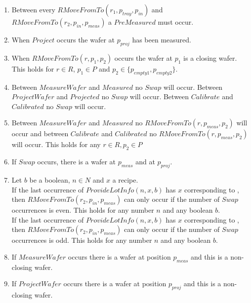 \begin{enumerate}
    \item Between every $\mathit{RMoveFromTo}(r_1, p_\mathit{tray},p_\mathit{in})$ and $\mathit{RMoveFromTo}(r_2, p_\mathit{in}, p_\mathit{meas})$ a $\mathit{PreMeasured}$ must occur.

    \item When $Project$ occurs the wafer at $p_\mathit{proj}$ has been measured.

    \item When $RMoveFromTo(r, p_1, p_2)$ occurs the wafer at $p_1$ is a closing wafer. This holds for $r \in R$, $p_1 \in P$ and $p_2 \in \{p_\textit{empty1}, p_\textit{empty2}\}$.
    
    \item Between $MeasureWafer$ and $Measured$ no $Swap$ will occur. Between $ProjectWafer$ and $Projected$ no $Swap$ will occur. Between $Calibrate$ and $Calibrated$ no $Swap$ will occur.

    \item Between $MeasureWafer$ and $Measured$ no $RMoveFromTo(r, p_\mathit{meas}, p_2)$ will occur and between $Calibrate$ and $Calibrated$ no $RMoveFromTo(r, p_\mathit{meas}, p_2)$ will occur. This holds for any $r \in R, p_2 \in P$
    
    \item If $Swap$ occurs, there is a wafer at $p_\mathit{meas}$ and at $p_\mathit{proj}$.

    \item Let $b$ be a boolean, $n \in N$ and $x$ a recipe.  \\
        If the last occurrence of $\mathit{ProvideLotInfo}(n, x, b)$ has $x$ corresponding to \recipeOne, then $\mathit{RMoveFromTo}(r_2,p_\mathit{in},p_\mathit{meas})$ can only occur if the number of $\mathit{Swap}$ occurrences is even.
        This holds for any number $n$ and any boolean $b$. \\
        If the last occurrence of $\mathit{ProvideLotInfo}(n, x, b)$ has $x$ corresponding to \recipeTwo, then $\mathit{RMoveFromTo}(r_2,p_\mathit{in},p_\mathit{meas})$ can only occur if the number of $\mathit{Swap}$ occurrences is odd.
        This holds for any number $n$ and any boolean $b$. \\

    \item If $MeasureWafer$ occurs there is a wafer at position $p_\mathit{meas}$ and this is a non-closing wafer.
    \item If $ProjectWafer$ occurs there is a wafer at position $p_\mathit{proj}$ and this is a non-closing wafer.


\end{enumerate}
